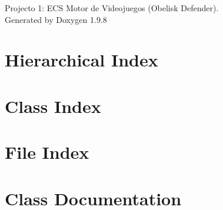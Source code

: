 \documentclass[twoside]{book}
\newcommand{\+}{\discretionary{\mbox{\scriptsize$\hookleftarrow$}}{}{}}
\newcommand{\clearemptydoublepage}{%
    \newpage{\pagestyle{empty}\cleardoublepage}%
  }
\begin{document}
  \raggedbottom
    \hypersetup{pageanchor=false,
                bookmarksnumbered=true,
                pdfencoding=unicode
               }
  \begin{titlepage}
  \vspace*{7cm}
  \begin{center}%
  {\Large Projecto 1\+: ECS Motor de Videojuegos (\+Obelisk Defender).}\\
  \vspace*{1cm}
  {\large Generated by Doxygen 1.9.8}\\
  \end{center}
  \end{titlepage}
  \clearemptydoublepage
  \tableofcontents
  \clearemptydoublepage
  \hypersetup{pageanchor=true}
\chapter{Hierarchical Index}

\chapter{Class Index}

\chapter{File Index}

\chapter{Class Documentation}




















































\end{document}
